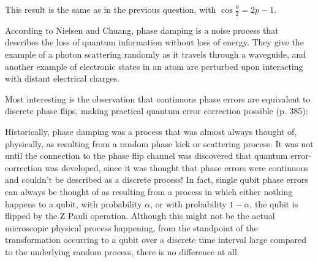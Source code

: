\documentclass[12pt]{extarticle}
\begin{document}
This result is the same as in the previous question, with $\cos\frac{\theta}{2} = 2p-1$.


According to Nielsen and Chuang, phase damping is a noise process that describes the loss of quantum information without loss of energy.
They give the example of a photon scattering randomly as it travels through a waveguide,
and another example of electronic states in an atom are perturbed upon interacting with distant electrical charges.

Most interesting is the observation that continuous phase errors are equivalent to discrete phase flips, making practical quantum error correction possible (p. 385):

\begin{displayquote}
    Historically, phase damping was a process that was almost always thought of, physically,
    as resulting from a random phase kick or scattering process. It was not until the
    connection to the phase flip channel was discovered that quantum error-correction was
    developed, since it was thought that phase errors were continuous and couldn't be described
    as a discrete process! In fact, single qubit phase errors can always be thought of
    as resulting from a process in which either nothing happens to a qubit, with probability
    $\alpha$, or with probability $1-\alpha$, the qubit is flipped by the Z Pauli operation. Although this
    might not be the actual microscopic physical process happening, from the standpoint of
    the transformation occurring to a qubit over a discrete time interval large compared to
    the underlying random process, there is no difference at all.
\end{displayquote}


\printbibliography
{}
\end{document}

